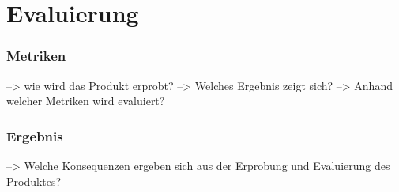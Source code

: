 \chapter{Evaluierung} \label{evaluierung}

\subsection{Metriken}\label{metriken}
--> wie wird das Produkt erprobt? 
--> Welches Ergebnis zeigt sich?
--> Anhand welcher Metriken wird evaluiert?

\subsection{Ergebnis} \label{ergebnis}
--> Welche Konsequenzen ergeben sich aus der Erprobung und Evaluierung des Produktes?
